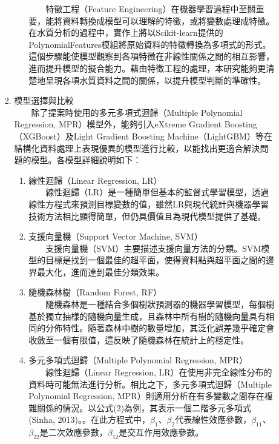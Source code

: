 \documentclass[12pt,a4paper]{article}
\begin{document}
\begin{enumerate}
\begin{enumerate}[label=\arabic*.]
\begin{enumerate}[label=2-2-\arabic*.]
\begin{enumerate}[label=\Alph*.]
                　　特徵工程（Feature Engineering）在機器學習過程中至關重要，能將資料轉換成模型可以理解的特徵，或將變數處理成特徵\cite{ref28}。在水質分析的過程中，實作上將以Scikit-learn提供的PolynomialFeatures模組將原始資料的特徵轉換為多項式的形式。這個步驟能使模型觀察到各項特徵在非線性關係之間的相互影響，進而提升模型的擬合能力。藉由特徵工程的處理，本研究能夠更清楚地呈現各項水質資料之間的關係，以提升模型判斷的準確性。
            \end{enumerate}
        \item 模型選擇與比較\\
        　　除了提案時使用的多元多項式迴歸（Multiple Polynomial Regression, MPR）模型外，能夠引入eXtreme Gradient Boosting（XGBoost）及Light Gradient Boosting Machine（LightGBM）等在結構化資料處理上表現優異的模型進行比較，以能找出更適合解決問題的模型。各模型詳細說明如下：
            \begin{enumerate}[label=\Alph*.]
                \item 線性迴歸（Linear Regression, LR）\\
                　　線性迴歸（LR）是一種簡單但基本的監督式學習模型，透過線性方程式來預測目標變數的值，雖然LR與現代統計與機器學習技術方法相比顯得簡單，但仍具價值且為現代模型提供了基礎\cite{ref29}。
                \item 支援向量機（Support Vector Machine, SVM）\\
                　　支援向量機（SVM）主要描述支援向量方法的分類\cite{ref30}。SVM模型的目標是找到一個最佳的超平面，使得資料點與超平面之間的邊界最大化，進而達到最佳分類效果\cite{ref31}。
                \item 隨機森林樹（Random Forest, RF）\\
                　　隨機森林是一種結合多個樹狀預測器的機器學習模型，每個樹基於獨立抽樣的隨機向量生成，且森林中所有樹的隨機向量具有相同的分佈特性。隨著森林中樹的數量增加，其泛化誤差幾乎確定會收斂至一個有限值，這反映了隨機森林在統計上的穩定性\cite{ref32}。
                \item 多元多項式迴歸（Multiple Polynomial Regression, MPR）\\
                　　線性迴歸（Linear Regression, LR）在使用非完全線性分布的資料時可能無法進行分析。相比之下，多元多項式迴歸（Multiple Polynomial Regression, MPR）則適用分析在有多變數之間存在複雜關係的情況。以公式(2)為例，其表示一個二階多元多項式(Sinha, 2013)。\cite{ref33}。在此方程式中，$\beta_1$、$\beta_2$代表線性效應參數，$\beta_{11}$、$\beta_{22}$是二次效應參數，$\beta_{12}$是交互作用效應參數。       
                    \begin{equation}

\end{equation}
\end{enumerate}
\end{enumerate}
\end{enumerate}
\end{enumerate}
\end{document}
